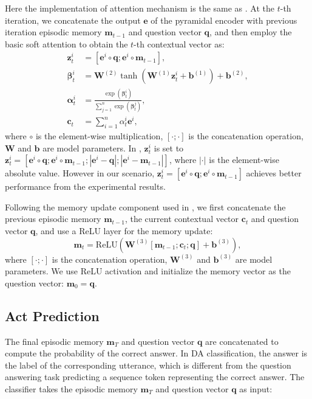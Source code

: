 \documentclass[conference]{IEEEtran}
\begin{document}
	Here the implementation of attention mechanism is the same as \cite{bahdanau2014neural}. At the $t$-th iteration, we concatenate the output $\mathbf{e}$ of the pyramidal encoder with previous iteration episodic memory $\mathbf{m}_{t-1}$  and question vector $\mathbf{q}$, and then employ the basic soft attention to obtain the $t$-th contextual vector as:
	\begin{align}
	\mathbf{z}_t^i &=[\mathbf{e}^i \circ \mathbf{q}; \mathbf{e}^i \circ \mathbf{m}_{t-1}],\\
	\mathbf{\beta}_t^i  &= \mathbf{W}^{(2)}\tanh \left(\mathbf{W}^{(1)}\mathbf{z}_t^i+\mathbf{b}^{(1)} \right)+\mathbf{b}^{(2)},\\
	\mathbf{\alpha}_t^i &=\frac{\exp(\mathbf{\beta}_t^i)}{\sum_{j=1}^n\exp(\mathbf{\beta}_t^j)}, \\
	\mathbf{c}_t &=\sum_{i=1}^n\alpha_t^i \mathbf{e}^i,
	\end{align}
	where $\circ$ is the element-wise multiplication, $[\cdot;\cdot]$ is the concatenation operation, $\mathbf{W}$ and $\mathbf{b}$ are model parameters. In \cite{xiong2016dynamic}, $\mathbf{z}_t^i$ is set to $\mathbf{z}_t^i=[\mathbf{e}^i \circ \mathbf{q}; \mathbf{e}^i \circ \mathbf{m}_{t-1}; |\mathbf{e}^i - \mathbf{q}|; |\mathbf{e}^i - \mathbf{m}_{t-1}|]$, where $|\cdot|$ is the element-wise absolute value. However in our scenario, $\mathbf{z}_t^i =[\mathbf{e}^i \circ \mathbf{q}; \mathbf{e}^i \circ \mathbf{m}_{t-1}]$ achieves better performance from the experimental results.
	
	Following the memory update component used in \cite{peng2015towards}, we first concatenate the previous episodic memory $\mathbf{m}_{t-1}$, the current contextual vector $\mathbf{c}_t$ and question vector $\mathbf{q}$, and use a ReLU layer for the memory update:
	\begin{equation}
	\mathbf{m}_t=\text{ReLU}(\mathbf{W}^{(3)}[\mathbf{m}_{t-1};\mathbf{c}_t;\mathbf{q}]+\mathbf{\mathbf{b}}^{(3)}), 
	\end{equation}
	where $[\cdot;\cdot]$ is the concatenation operation, $\mathbf{W}^{(3)}$ and $\mathbf{b}^{(3)}$ are model parameters. We use ReLU activation and initialize the memory vector as the question vector: $\mathbf{m}_0=\mathbf{q}$. 
	
	\subsection{Act Prediction}\label{subsec_output}
	The final episodic memory $\mathbf{m}_T$ and question vector $\mathbf{q}$ are concatenated to compute the probability of the correct answer. In DA classification, the answer is the label of the corresponding utterance, which is different from the question answering task predicting a sequence token representing the correct answer. 
The classifier takes the episodic memory $\mathbf{m}_T$ and question vector $\mathbf{q}$ as input:
	
\end{document}
